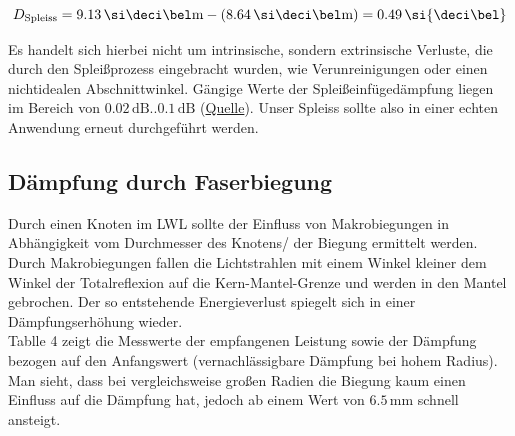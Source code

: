 \[D_{\text{Spleiss}} = 9.13 \, \dBm - (8.64 \, \dBm) = 0.49 \, \si{\deci\bel}\]

Es handelt sich hierbei nicht um intrinsische, sondern extrinsische Verluste, die durch den Spleißprozess eingebracht wurden, wie Verunreinigungen oder einen nichtidealen Abschnittwinkel. Gängige Werte der Spleißeinfügedämpfung liegen im Bereich von $0.02 \, \si{\deci\bel} .. 0.1 \, \si{\deci\bel}$ (\href{https://blog.energiedienst.de/spleissen/}{Quelle}). Unser Spleiss sollte also in einer echten Anwendung erneut durchgeführt werden.

\subsection{Dämpfung durch Faserbiegung}
Durch einen Knoten im LWL sollte der Einfluss von Makrobiegungen in Abhängigkeit vom Durchmesser des Knotens/ der Biegung ermittelt werden. Durch Makrobiegungen fallen die Lichtstrahlen mit einem Winkel kleiner dem Winkel der Totalreflexion auf die Kern-Mantel-Grenze und werden in den Mantel gebrochen. Der so entstehende Energieverlust spiegelt sich in einer Dämpfungserhöhung wieder.\\

Tablle 4 zeigt die Messwerte der empfangenen Leistung sowie der Dämpfung bezogen auf den Anfangswert (vernachlässigbare Dämpfung bei hohem Radius).
Man sieht, dass bei vergleichsweise großen Radien die Biegung kaum einen Einfluss auf die Dämpfung hat, jedoch ab einem Wert von $6.5 \, \si{\milli\meter}$ schnell ansteigt.

